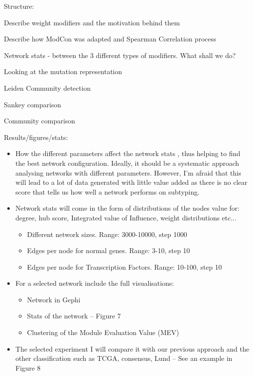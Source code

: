 \newpage

Structure:
\begin{todolist}
    \item [\done] Describe weight modifiers and the motivation behind them
    \item [\done] Describe how ModCon was adapted and Spearman Correlation process 
    \item Network stats - between the 3 different types of modifiers. What shall we do?
    \item Looking at the mutation representation 
    \item Leiden Community detection
    \item Sankey comparison
    \item Community comparison 
\end{todolist}


Results/figures/stats:
\begin{itemize}

    \item How the different parameters affect the network stats , thus helping to find the best network configuration. Ideally, it should be a systematic approach analysing networks with different parameters. However, I’m afraid that this will lead to a lot of data generated with little value added as there is no clear score that tells us how well a network performs on subtyping.
    \item Network stats will come in the form of distributions of the nodes value for: degree, hub score, Integrated value of Influence, weight distributions etc...
          \begin{itemize}
              \item Different network sizes. Range: 3000-10000, step 1000
              \item Edges per node for normal genes. Range: 3-10, step 10
              \item Edges per node for Transcription Factors. Range: 10-100, step 10
          \end{itemize}
    \item For a selected network include the full visualisations:
          \begin{itemize}
              \item Network in Gephi
              \item Stats of the network – Figure 7
              \item Clustering of the Module Evaluation Value (MEV)
          \end{itemize}

    \item The selected experiment I will compare it with our previous approach and the other classification such as TCGA, consensus, Lund – See an example in Figure 8
\end{itemize}


